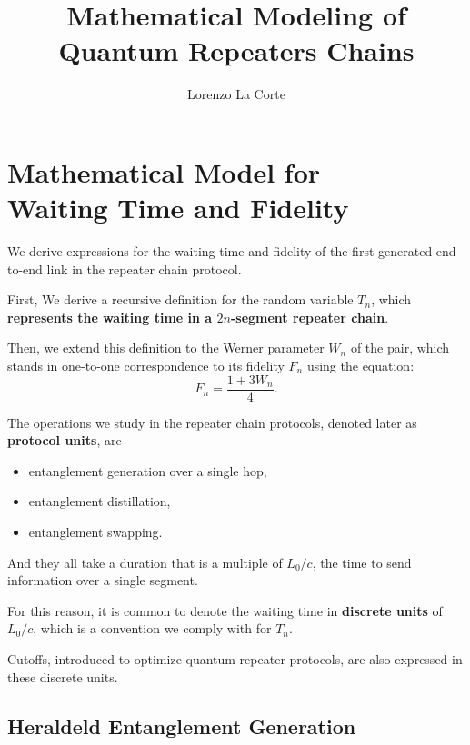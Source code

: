 \documentclass{masterthesis}
\begin{document}
\title{Mathematical Modeling of Quantum Repeaters Chains}

\author{Lorenzo La Corte}

\advisor{}

\examiner{}

\maketitle

\chapter*{Mathematical Model for \\ Waiting Time and Fidelity}

We derive expressions for the waiting time and fidelity of the first generated end-to-end link in the repeater chain protocol. 

First, We derive a recursive definition for the random variable $T_n$, which \textbf{represents the waiting time in a $2n$-segment repeater chain}.

Then, we extend this definition to the Werner parameter $W_n$ of the pair, which stands in one-to-one correspondence to its fidelity $F_n$ using the equation:
\begin{equation}
    F_n = \frac{1 + 3 W_n}{4}.
\end{equation}

The operations we study in the repeater chain protocols, denoted later as \textbf{protocol units}, are
\begin{itemize}
    \item entanglement generation over a single hop,
    \item entanglement distillation,
    \item entanglement swapping.
\end{itemize}

And they all take a duration that is a multiple of ${L_0}/{c}$, the time to send information over a single segment.

For this reason, it is common to denote the waiting time in \textbf{discrete units} of ${L_0}/{c}$, which is a convention we comply with for $T_n$. 

Cutoffs, introduced to optimize quantum repeater protocols, are also expressed in these discrete units.

\newpage
\section*{Heraldeld Entanglement Generation}\label{section:heralded_entanglement_generation}
\end{document}
